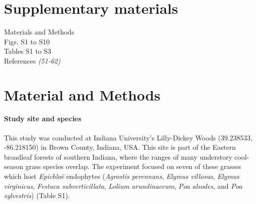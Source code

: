 \documentclass[12pt]{article}
\begin{document}

\section*{Supplementary materials}
Materials and Methods\\


Figs. S1 to S10\\
Tables S1 to S3\\
References \textit{(51-62)}


\section*{Material and Methods}
\paragraph*{Study site and species}
This study was conducted at Indiana University's Lilly-Dickey Woods (39.238533, -86.218150) in Brown County, Indiana, USA. 
This site is part of the Eastern broadleaf forests of southern Indiana, where the ranges of many understory cool-season grass species overlap. 
The experiment focused on seven of these grasses which host \emph{Epichlo\"e} endophytes (\emph{Agrostis perennans}, \emph{Elymus villosus}, \emph{Elymus virginicus}, \emph{Festuca subverticillata}, \emph{Lolium arundinaceum}, \emph{Poa alsodes}, and \emph{Poa sylvestris}) (Table S1). 
\end{document}

